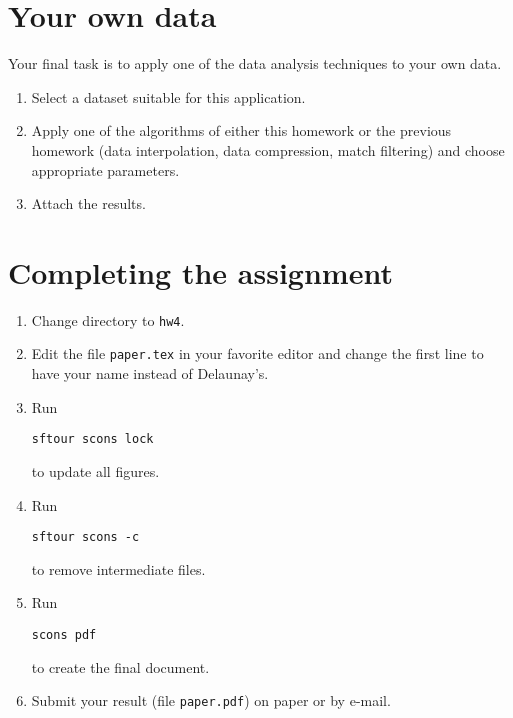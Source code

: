 \lstset{language=c,numbers=left,numberstyle=\tiny,showstringspaces=false}


\lstset{language=python,numbers=left,numberstyle=\tiny,showstringspaces=false}


\newpage

\section{Your own data}

Your final task is to apply one of the data analysis techniques to your own data.
\begin{enumerate}
\item Select a dataset suitable for this application.
\item Apply one of the algorithms of either this homework or the
  previous homework (data interpolation, data compression, match
  filtering) and choose appropriate parameters.
\item Attach the results.
\end{enumerate}


\section{Completing the assignment}

\begin{enumerate}
\item Change directory to \texttt{hw4}.
\item Edit the file \texttt{paper.tex} in your favorite editor and change the
  first line to have your name instead of Delaunay's.
\item Run
\begin{verbatim}
sftour scons lock
\end{verbatim}
to update all figures.
\item Run
\begin{verbatim}
sftour scons -c
\end{verbatim}
to remove intermediate files.
\item Run
\begin{verbatim}
scons pdf
\end{verbatim}
to create the final document.
\item Submit your result (file \texttt{paper.pdf}) on paper or by
e-mail.
\end{enumerate}




